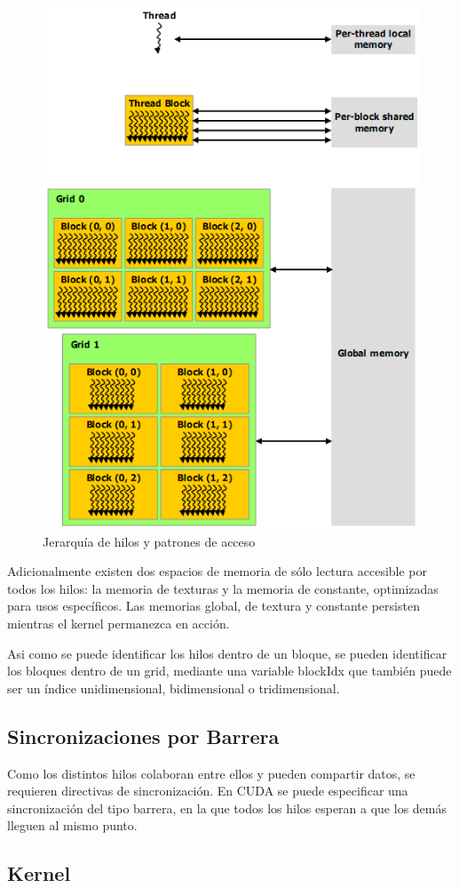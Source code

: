 \documentclass[twocolumn,twoside]{Jornadas}
\begin{document}
\begin{figure}
   \begin{center}
      \includegraphics[width=.5\textwidth]{MemoriaHierarchy.png}
      \caption{\label{fig:MemoriaHierarchy}Jerarquía de hilos y patrones de acceso}
   \end{center}
\end{figure}

Adicionalmente existen dos espacios de memoria de sólo lectura accesible por todos los hilos: la memoria de texturas y la memoria de constante, optimizadas para usos específicos. Las memorias global, de textura y constante persisten mientras el kernel permanezca en acción.

Asi como se puede identificar los hilos dentro de un bloque, se pueden identificar los bloques dentro de un grid, mediante una variable blockIdx que también puede ser un índice unidimensional, bidimensional o tridimensional.

\subsection{Sincronizaciones por Barrera}

Como los distintos hilos colaboran entre ellos y pueden compartir datos, se requieren directivas de sincronización. En CUDA se puede especificar una sincronización del tipo barrera, en la que todos los hilos esperan a que los demás lleguen al mismo punto.

\subsection{Kernel}
\end{document}
